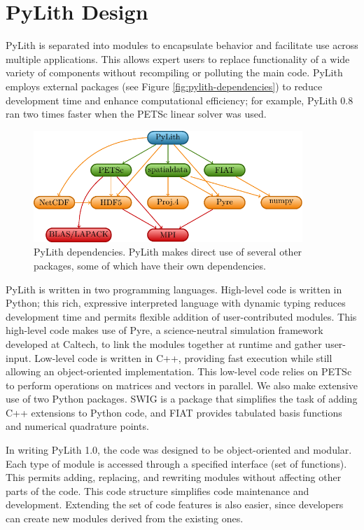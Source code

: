 \section{PyLith Design}

PyLith is separated into modules to encapsulate behavior and facilitate
use across multiple applications. This allows expert users to replace
functionality of a wide variety of components without recompiling
or polluting the main code. PyLith employs external packages (see
Figure \vref{fig:pylith-dependencies}) to reduce development time
and enhance computational efficiency; for example, PyLith 0.8 ran
two times faster when the PETSc linear solver was used.

\begin{figure}[htbp]
  \includegraphics[width=4in]{intro/figs/packages}
  \caption{PyLith dependencies. PyLith makes direct use of several
    other packages, some of which have their own dependencies.}
  \label{fig:pylith-dependencies}
\end{figure}

PyLith is written in two programming languages. High-level code is
written in Python; this rich, expressive interpreted language with
dynamic typing reduces development time and permits flexible addition
of user-contributed modules. This high-level code makes use of Pyre, a
science-neutral simulation framework developed at Caltech, to link the
modules together at runtime and gather user-input. Low-level code is
written in C++, providing fast execution while still allowing an
object-oriented implementation. This low-level code relies on PETSc to
perform operations on matrices and vectors in parallel. We also make
extensive use of two Python packages. SWIG is a package that
simplifies the task of adding C++ extensions to Python code, and FIAT
provides tabulated basis functions and numerical quadrature points.

In writing PyLith 1.0, the code was designed to be object-oriented and
modular. Each type of module is accessed through a specified interface
(set of functions). This permits adding, replacing, and rewriting
modules without affecting other parts of the code. This code structure
simplifies code maintenance and development. Extending the set of code
features is also easier, since developers can create new modules
derived from the existing ones.

